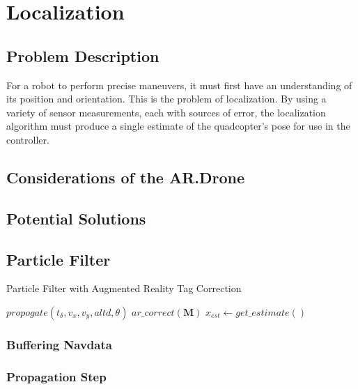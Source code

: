 
\chapter{Localization\label{ch:localization}}

\section{Problem Description}
For a robot to perform precise maneuvers, it must first have an understanding of its position and orientation. This is the problem of localization. By using a variety of sensor measurements, each with sources of error, the localization algorithm must produce a single estimate of the quadcopter's pose for use in the controller.  

\section{Considerations of the AR.Drone}

\section{Potential Solutions}

\section{Particle Filter}

	\begin{algorithm}
		\centering
		\caption{Particle Filter with Augmented Reality Tag Correction} 
		\begin{algorithmic}[1]
					\State $propogate(t_{\delta}, v_x, v_y, altd, \theta)$
				\EndIf
					\State $ar\_correct(\textbf{M})$ 
				\EndIf
				\State $x_{est} \gets get\_estimate()$
			\EndFor
		\end{algorithmic}
	\end{algorithm}

\subsection{Buffering Navdata}

\subsection{Propagation Step}

